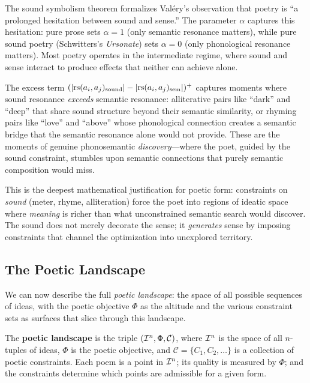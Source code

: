 \begin{interpretation}
\label{interp:phonosemantics}
The sound symbolism theorem formalizes Valéry's observation that poetry is
``a prolonged hesitation between sound and sense.''  The parameter $\alpha$
captures this hesitation: pure prose sets $\alpha = 1$ (only semantic
resonance matters), while pure sound poetry (Schwitters's \textit{Ursonate})
sets $\alpha = 0$ (only phonological resonance matters).  Most poetry
operates in the intermediate regime, where sound and sense interact to
produce effects that neither can achieve alone.

The excess term $(|\mathrm{rs}(a_i, a_j)_{\text{sound}}| - |\mathrm{rs}(a_i, a_j)_{\text{sem}}|)^+$
captures moments where sound resonance \emph{exceeds} semantic resonance:
alliterative pairs like ``dark'' and ``deep'' that share sound structure beyond
their semantic similarity, or rhyming pairs like ``love'' and ``above'' whose
phonological connection creates a semantic bridge that the semantic resonance
alone would not provide.  These are the moments of genuine phonosemantic
\emph{discovery}---where the poet, guided by the sound constraint, stumbles
upon semantic connections that purely semantic composition would miss.

This is the deepest mathematical justification for poetic form: constraints
on \emph{sound} (meter, rhyme, alliteration) force the poet into regions of
ideatic space where \emph{meaning} is richer than what unconstrained semantic
search would discover.  The sound does not merely decorate the sense; it
\emph{generates} sense by imposing constraints that channel the optimization
into unexplored territory.
\end{interpretation}


\subsection{The Poetic Landscape}

We can now describe the full \emph{poetic landscape}: the space of all
possible sequences of ideas, with the poetic objective $\Phi$ as the
altitude and the various constraint sets as surfaces that slice through this
landscape.

\begin{definition}
\label{def:poetic-landscape}
The \textbf{poetic landscape} is the triple $(\mathcal{I}^n, \Phi, \mathcal{C})$,
where $\mathcal{I}^n$ is the space of all $n$-tuples of ideas, $\Phi$ is the
poetic objective, and $\mathcal{C} = \{C_1, C_2, \ldots\}$ is a collection
of poetic constraints.  Each poem is a point in $\mathcal{I}^n$; its quality is
measured by $\Phi$; and the constraints determine which points are admissible
for a given form.
\end{definition}

